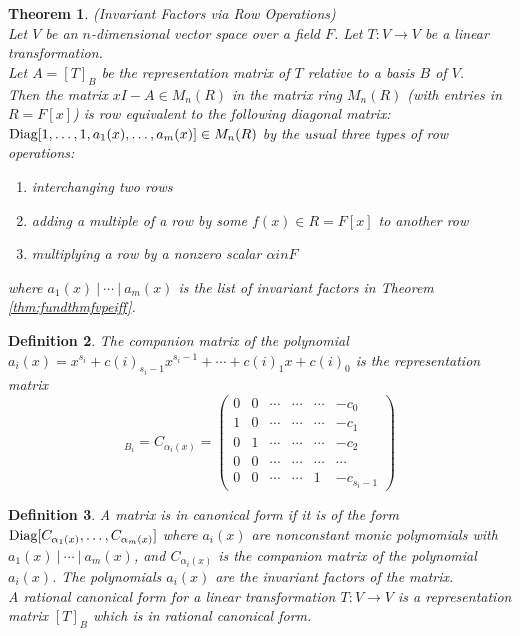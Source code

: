 \documentclass[a4paper,8pt]{article}
\newcommand{\hlt}[1]{\textit{{\color{blue}#1}}}
\theoremstyle{theorem}
\newtheorem{theorem}{Theorem}[subsection]
\newtheorem{definition}[theorem]{Definition}
\begin{document}
\begin{theorem}
\label{thm:ifvro}
\hlt{(Invariant Factors via Row Operations)}\\
Let $V$ be an $n$-dimensional vector space over a field $F$. Let $T: V \rightarrow V$ be a linear transformation.\\
Let $A=[T]_B$ be the representation matrix of $T$ relative to a basis $B$ of $V$.\\
Then the matrix $xI - A \in M_n(R)$ in the matrix ring $M_n(R)$ (with entries in $R = F[x]$) is row equivalent to the following diagonal matrix: $\textnormal{Diag}[1, \ldots, 1, a_1(x), \ldots, a_m(x)] \in M_n(R)$ by the usual three types of row operations:
\begin{enumerate}[label=(\roman*)]
\item interchanging two rows
\item adding a multiple of a row by some $f(x) \in R = F[x]$ to another row
\item multiplying a row by a nonzero scalar $\alpha in F$
\end{enumerate}
where $a_1(x) \ | \ \cdots \ | \ a_m(x)$ is the list of invariant factors in Theorem \ref{thm:fundthmfvpeiff}.
\end{theorem}

\begin{definition}
The \hlt{companion matrix} of the polynomial $a_i(x) = x^{s_i} + c(i)_{{s_i}-1}x^{{s_i}-1} + \cdots + c(i)_1 x + c(i)_0$ is the representation matrix
\begin{equation}
[T|_{V_{\alpha_i}}]_{B_i} = C_{\alpha_i (x)} =
\begin{pmatrix}
0 & 0 & \cdots & \cdots & \cdots & -c_0 \\
1 & 0 & \cdots & \cdots & \cdots & -c_1 \\
0 & 1 & \cdots & \cdots & \cdots & -c_2 \\
0 & 0 & \cdots & \cdots & \cdots & \cdots \\
0 & 0 & \cdots & \cdots & 1 & -c_{s_i -1}
\end{pmatrix} \nonumber
\end{equation}
\end{definition}

\begin{definition}
A matrix is in \hlt{canonical form} if it is of the form $\textnormal{Diag}[C_{\alpha_1 (x)}, \ldots, C_{\alpha_m(x)}]$ where $a_i(x)$ are nonconstant monic polynomials with $a_1(x) \ | \ \cdots \ | \ a_m(x)$, and $C_{\alpha_i (x)}$ is the companion matrix of the polynomial $a_i(x)$. The polynomials $a_i(x)$ are the \hlt{invariant factors} of the matrix.\\
A rational canonical form for a linear transformation $T: V \rightarrow V$ is a representation matrix $[T]_B$ which is in rational canonical form.
\end{definition}
\end{document}
